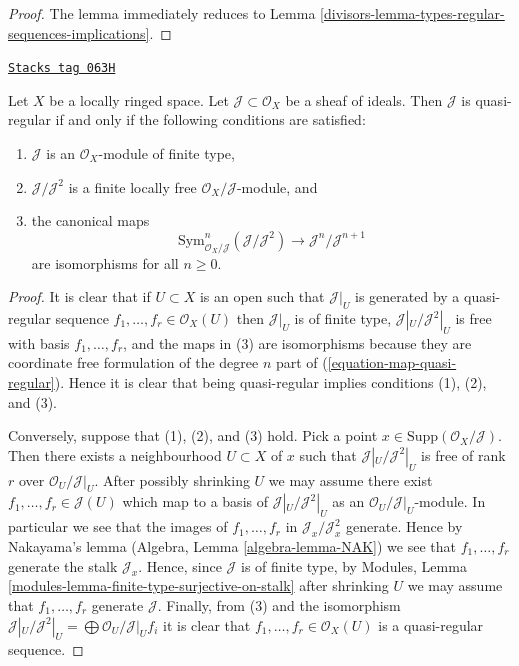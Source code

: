 \begin{proof}

The lemma immediately reduces to
Lemma \ref{divisors-lemma-types-regular-sequences-implications}.
\end{proof}

\begin{lemma}
\label{divisors-lemma-quasi-regular-ideal}
\href{https://stacks.math.columbia.edu/tag/063H}{\texttt{Stacks tag 063H}}

Let $X$ be a locally ringed space. Let $\mathcal{J} \subset \mathcal{O}_X$
be a sheaf of ideals. Then $\mathcal{J}$ is quasi-regular if and
only if the following conditions are satisfied:
\begin{enumerate}
\item $\mathcal{J}$ is an $\mathcal{O}_X$-module of finite type,
\item $\mathcal{J}/\mathcal{J}^2$ is a finite locally free
$\mathcal{O}_X/\mathcal{J}$-module, and
\item the canonical maps
$$
\text{Sym}^n_{\mathcal{O}_X/\mathcal{J}}(\mathcal{J}/\mathcal{J}^2)
\longrightarrow
\mathcal{J}^n/\mathcal{J}^{n + 1}
$$
are isomorphisms for all $n \geq 0$.
\end{enumerate}
\end{lemma}

\begin{proof}
It is clear that if $U \subset X$ is an open such that
$\mathcal{J}|_U$ is generated by a quasi-regular sequence
$f_1, \ldots, f_r \in \mathcal{O}_X(U)$ then $\mathcal{J}|_U$
is of finite type, $\mathcal{J}|_U/\mathcal{J}^2|_U$ is free
with basis $f_1, \ldots, f_r$, and the maps in (3) are isomorphisms
because they are coordinate free formulation of the degree $n$
part of (\ref{equation-map-quasi-regular}). Hence it is clear that
being quasi-regular implies conditions (1), (2), and (3).

\medskip\noindent
Conversely, suppose that (1), (2), and (3) hold. Pick a point
$x \in \text{Supp}(\mathcal{O}_X/\mathcal{J})$. Then there exists
a neighbourhood $U \subset X$ of $x$ such that
$\mathcal{J}|_U/\mathcal{J}^2|_U$
is free of rank $r$ over $\mathcal{O}_U/\mathcal{J}|_U$.
After possibly shrinking $U$ we may assume there exist
$f_1, \ldots, f_r \in \mathcal{J}(U)$ which map to a basis
of $\mathcal{J}|_U/\mathcal{J}^2|_U$ as an
$\mathcal{O}_U/\mathcal{J}|_U$-module.
In particular we see that the images of $f_1, \ldots, f_r$ in
$\mathcal{J}_x/\mathcal{J}^2_x$ generate. Hence by Nakayama's lemma
(Algebra, Lemma \ref{algebra-lemma-NAK})
we see that $f_1, \ldots, f_r$ generate the stalk $\mathcal{J}_x$.
Hence, since $\mathcal{J}$ is of finite type, by
Modules, Lemma \ref{modules-lemma-finite-type-surjective-on-stalk}
after shrinking $U$ we may assume that $f_1, \ldots, f_r$ generate
$\mathcal{J}$. Finally, from (3) and the isomorphism
$\mathcal{J}|_U/\mathcal{J}^2|_U = \bigoplus \mathcal{O}_U/\mathcal{J}|_U f_i$
it is clear that $f_1, \ldots, f_r \in \mathcal{O}_X(U)$
is a quasi-regular sequence.
\end{proof}

